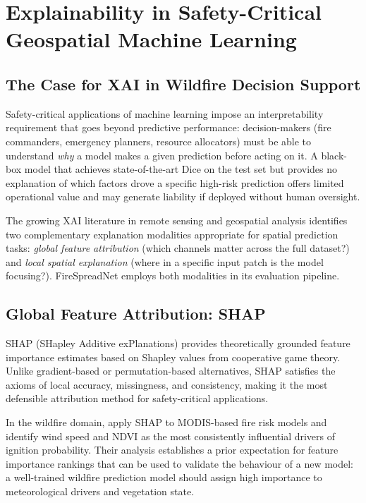 \section{Explainability in Safety-Critical Geospatial Machine Learning}
\label{sec:sota_xai}

\subsection{The Case for XAI in Wildfire Decision Support}

Safety-critical applications of machine learning impose an interpretability requirement that goes beyond predictive performance: decision-makers (fire commanders, emergency planners, resource allocators) must be able to understand \emph{why} a model makes a given prediction before acting on it.
A black-box model that achieves state-of-the-art Dice on the test set but provides no explanation of which factors drove a specific high-risk prediction offers limited operational value and may generate liability if deployed without human oversight.

The growing XAI literature in remote sensing and geospatial analysis \citep{xaireview2024} identifies two complementary explanation modalities appropriate for spatial prediction tasks: \emph{global feature attribution} (which channels matter across the full dataset?) and \emph{local spatial explanation} (where in a specific input patch is the model focusing?).
FireSpreadNet employs both modalities in its evaluation pipeline.

\subsection{Global Feature Attribution: SHAP}

SHAP (SHapley Additive exPlanations) \citep{lundberg2017shap} provides theoretically grounded feature importance estimates based on Shapley values from cooperative game theory.
Unlike gradient-based or permutation-based alternatives, SHAP satisfies the axioms of local accuracy, missingness, and consistency, making it the most defensible attribution method for safety-critical applications.

In the wildfire domain, \citet{shap2024wildfire} apply SHAP to MODIS-based fire risk models and identify wind speed and NDVI as the most consistently influential drivers of ignition probability.
Their analysis establishes a prior expectation for feature importance rankings that can be used to validate the behaviour of a new model: a well-trained wildfire prediction model should assign high importance to meteorological drivers and vegetation state.

